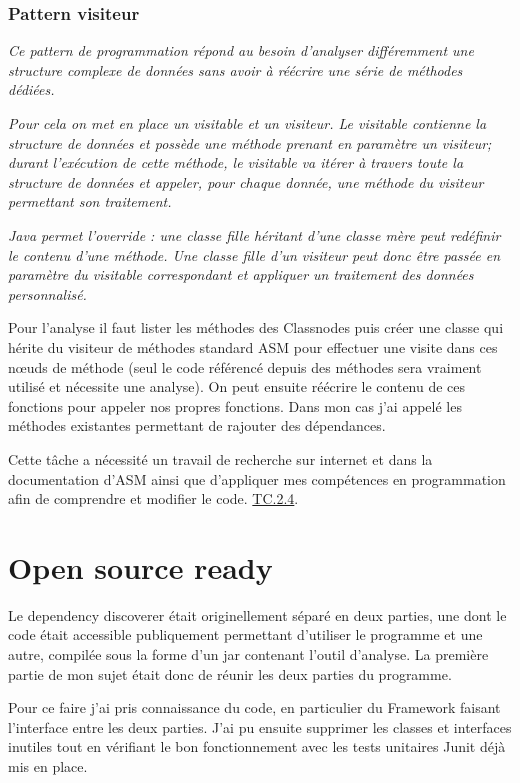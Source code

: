 \documentclass[french,a4paper,12pt]{report}
\begin{document}
\bigskip

\subsubsection{Pattern visiteur} 

\textit{Ce pattern de programmation répond au besoin d'analyser différemment une structure complexe de données sans avoir à réécrire une série de méthodes dédiées.}

\textit{Pour cela on met en place un visitable et un visiteur. Le visitable contienne la structure de données et possède une méthode prenant en paramètre un visiteur; durant l’exécution de cette méthode, le visitable va itérer à travers toute la structure de données et appeler, pour chaque donnée, une méthode du visiteur permettant son traitement.}

\textit{Java permet l'override : une classe fille héritant d'une classe mère peut redéfinir le contenu d'une méthode. Une classe fille d'un visiteur peut donc être passée en paramètre du visitable correspondant et appliquer un traitement des données personnalisé.}


\bigskip

Pour l'analyse il faut lister les méthodes des Classnodes puis créer une classe qui hérite du visiteur de méthodes standard ASM pour effectuer une visite dans ces nœuds de méthode (seul le code référencé depuis des méthodes sera vraiment utilisé et nécessite une analyse). On peut ensuite réécrire le contenu de ces fonctions pour appeler nos propres fonctions. Dans mon cas j'ai appelé les méthodes existantes permettant de rajouter des dépendances.   

Cette tâche a nécessité un travail de recherche sur internet et dans la documentation d’ASM ainsi que d’appliquer mes compétences en programmation afin de comprendre et modifier le code. \hyperlink{competences}{TC.2.4}.

\section{Open source ready}

Le dependency discoverer était originellement séparé en deux parties, une dont le code était accessible publiquement permettant d'utiliser le programme et une autre, compilée sous la forme d'un jar contenant l'outil d'analyse. La première partie de mon sujet était donc de réunir les deux parties du programme.

Pour ce faire j'ai pris connaissance du code, en particulier du Framework faisant l'interface entre les deux parties. J'ai pu ensuite supprimer les classes et interfaces inutiles tout en vérifiant le bon fonctionnement avec les tests unitaires Junit déjà mis en place.
\end{document}
